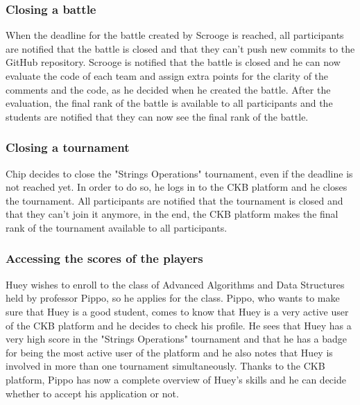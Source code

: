 \subsubsection{Closing a battle}
When the deadline for the battle created by Scrooge is reached, all participants are notified that the battle is closed and that they can't push new commits to the GitHub repository.
Scrooge is notified that the battle is closed and he can now evaluate the code of each team and assign extra points for the clarity of the comments and the code, as he decided when he created the battle.
After the evaluation, the final rank of the battle is available to all participants and the students are notified that they can now see the final rank of the battle.

\subsubsection{Closing a tournament}
Chip decides to close the "Strings Operations" tournament, even if the deadline is not reached yet.
In order to do so, he logs in to the CKB platform and he closes the tournament.
All participants are notified that the tournament is closed and that they can't join it anymore, in the end, the CKB platform makes the final rank of the tournament available to all participants.

\subsubsection{Accessing the scores of the players}
Huey wishes to enroll to the class of Advanced Algorithms and Data Structures held by professor Pippo, so he applies for the class.
Pippo, who wants to make sure that Huey is a good student, comes to know that Huey is a very active user of the CKB platform and he decides to check his profile.
He sees that Huey has a very high score in the "Strings Operations" tournament and that he has a badge for being the most active user of the platform and he also notes that Huey is involved in more than one tournament simultaneously.
Thanks to the CKB platform, Pippo has now a complete overview of Huey's skills and he can decide whether to accept his application or not.

